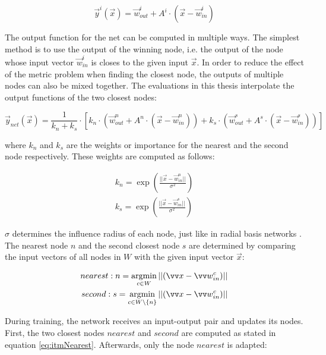 \begin{equation}
\vec{y}^i(\vec{x}) = \vec{w}^i_{out} + A^i \cdot (\vec{x}-\vec{w}^i_{in})
\label{eq:llmOut}
\end{equation}

The output function for the net can be computed in multiple ways. The simplest method is to use the output of the winning node, i.e. the output of the node whose input vector $\vec{w}^i_{in}$ is closes to the given input $\vec{x}$. In order to reduce the effect of the metric problem when finding the closest node, the outputs of multiple nodes can also be mixed together. The evaluations in this thesis interpolate the output functions of the two closest nodes:

\begin{equation}
\vec{y}_{net}(\vec{x}) =  \frac{1}{k_n+k_s} \cdot \left[ k_n \cdot \left(\vec{w}^n_{out} + A^n \cdot \left(\vec{x}-\vec{w}^n_{in}\right)\right) + k_s \cdot  \left(\vec{w}^s_{out} + A^s \cdot \left(\vec{x}-\vec{w}^s_{in}\right)\right)\right]
\end{equation}

where $k_n$ and $k_s$ are the weights or importance for the nearest and the second node respectively. These weights are computed as follows:

\begin{equation}
\begin{split}
k_n = \exp\left(\frac{||\vec{x}-\vec{w}^n_{in}||}{\sigma^2}\right) \\
k_s = \exp\left(\frac{||\vec{x}-\vec{w}^s_{in}||}{\sigma^2}\right) 
\end{split}
\end{equation}

$\sigma$ determines the influence radius of each node, just like in radial basis networks \cite{rbf}. The nearest node $n$ and the second closest node $s$ are determined by comparing the input vectors of all nodes in $W$ with the given input vector $\vec{x}$:

\begin{equation}
\begin{split}
	nearest: n = \argmin_{c\in W} ||(\vec{x} - \vec{w}^c_{in})|| \\
	second: s = \argmin_{c\in W\backslash\{n\}} ||(\vec{x} - \vec{w}^c_{in})||
\end{split}
\label{eq:itmNearest}
\end{equation}

During training, the network receives an input-output pair and updates its nodes. First, the two closest nodes $nearest$ and $second$ are computed as stated in equation \ref{eq:itmNearest}. Afterwards, only the node $nearest$ is adapted:

